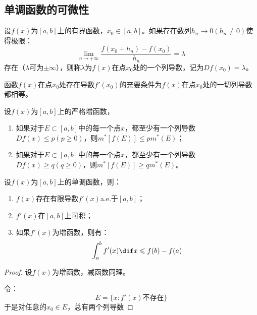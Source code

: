 \subsection{单调函数的可微性}
\begin{definition}
	设$f(x)$为$[a,b]$上的有界函数，$x_0\in[a,b]$。如果存在数列$h_n\to0(h_n\ne0)$使得极限：
	\begin{equation*}
		\lim_{n\to+\infty}\frac{f(x_0+h_n)-f(x_0)}{h_n}=\lambda
	\end{equation*}
	存在（$\lambda$可为$\pm\infty$），则称$\lambda$为$f(x)$在点$x_0$处的一个列导数，记为$Df(x_0)=\lambda$。
\end{definition}
\begin{theorem}
	函数$f(x)$在点$x_0$处存在导数$f'(x_0)$的充要条件为$f(x)$在点$x_0$处的一切列导数都相等。
\end{theorem}
\begin{lemma}
	设$f(x)$为$[a,b]$上的严格增函数，
	\begin{enumerate}
		\item 如果对于$E\subset[a,b]$中的每一个点$x$，都至少有一个列导数$Df(x)\leqslant p(p\geqslant0)$，则$m^*[f(E)]\leqslant pm^*(E)$；
		\item 如果对于$E\subset[a,b]$中的每一个点$x$，都至少有一个列导数$Df(x)\geqslant q(q\geqslant0)$，则$m^*[f(E)]\geqslant qm^*(E)$。
	\end{enumerate}
\end{lemma}
\begin{theorem}\label{theo:Lebesgue theorem}
	设$f(x)$为$[a,b]$上的单调函数，则：
	\begin{enumerate}
		\item $f(x)$存在有限导数$f'(x)$a.e.于$[a,b]$；
		\item $f'(x)$在$[a,b]$上可积；
		\item 如果$f'(x)$为增函数，则有：
		\begin{equation*}
			\int_{a}^{b}f'(x)\dif x\leqslant f(b)-f(a)
		\end{equation*}
	\end{enumerate}
\end{theorem}
\begin{proof}
	设$f(x)$为增函数，减函数同理。\par
	令：
	\begin{equation*}
		E=\{x:f'(x)\text{不存在}\}
	\end{equation*}
	于是对任意的$x_0\in E$，总有两个列导数
\end{proof}

